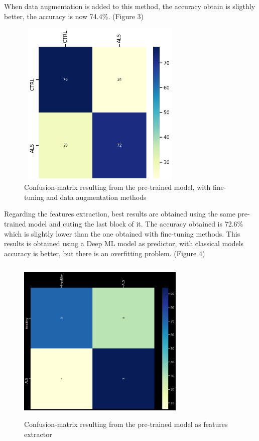 When data augmentation is added to this method, the accuracy obtain is sligthly better, the accuracy is now 74.4\%. (Figure 3)
\begin{figure}[H]
\centering
\caption{Confusion-matrix resulting from the pre-trained model, with fine-tuning and data augmentation methods}
\includegraphics[width=8cm, height=8cm]{finetuning_data_augmentation_model_results}
\end{figure}

Regarding the features extraction, best results are obtained using the same pre-trained model and cuting the last block of it. The accuracy obtained is 72.6\% which is slightly lower than the one obtained with fine-tuning methods. This results is obtained using a Deep ML model as predictor, with classical models accuracy is better, but there is an overfitting problem. (Figure 4)
\begin{figure}[H]
\centering
\caption{Confusion-matrix resulting from the pre-trained model as features extractor}
\includegraphics[width=8cm, height=8cm]{extractor_model_results}
\end{figure}

